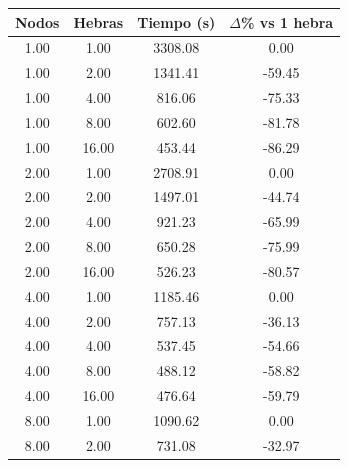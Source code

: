\begin{table}[ht]
    \centering
    \begin{tabular}{|c|c|c|c|}
        \hline
        \textbf{Nodos} & \textbf{Hebras} & \textbf{Tiempo (s)} & \textbf{$\Delta$\% vs 1 hebra} \\
        \hline
        1.00           & 1.00            & 3308.08             & 0.00                           \\
        1.00           & 2.00            & 1341.41             & -59.45                         \\
        1.00           & 4.00            & 816.06              & -75.33                         \\
        1.00           & 8.00            & 602.60              & -81.78                         \\
        1.00           & 16.00           & 453.44              & -86.29                         \\
        2.00           & 1.00            & 2708.91             & 0.00                           \\
        2.00           & 2.00            & 1497.01             & -44.74                         \\
        2.00           & 4.00            & 921.23              & -65.99                         \\
        2.00           & 8.00            & 650.28              & -75.99                         \\
        2.00           & 16.00           & 526.23              & -80.57                         \\
        4.00           & 1.00            & 1185.46             & 0.00                           \\
        4.00           & 2.00            & 757.13              & -36.13                         \\
        4.00           & 4.00            & 537.45              & -54.66                         \\
        4.00           & 8.00            & 488.12              & -58.82                         \\
        4.00           & 16.00           & 476.64              & -59.79                         \\
        8.00           & 1.00            & 1090.62             & 0.00                           \\
        8.00           & 2.00            & 731.08              & -32.97                         \\

\end{tabular}
\end{table}

